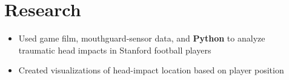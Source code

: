\documentclass[]{deedy-template}
\begin{document}
\begin{minipage}[t]{0.66\textwidth}
	\sectionsep


\section{Research}
	\begin{itemize}[noitemsep,topsep=0pt]
	\itemsep-0.2em 
	\item Used game film, mouthguard-sensor data, and \textbf{Python} to analyze
        \\traumatic head impacts in Stanford football players
	\item Created visualizations of head-impact location based on player position
	\end{itemize}

	\sectionsep

\end{minipage}
\end{document}
